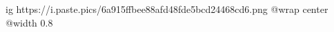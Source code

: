  
 
 
 
 

\ifcmt
	ig https://i.paste.pics/6a915ffbee88afd48fde5bcd24468cd6.png
  @wrap center
  @width 0.8
\fi

